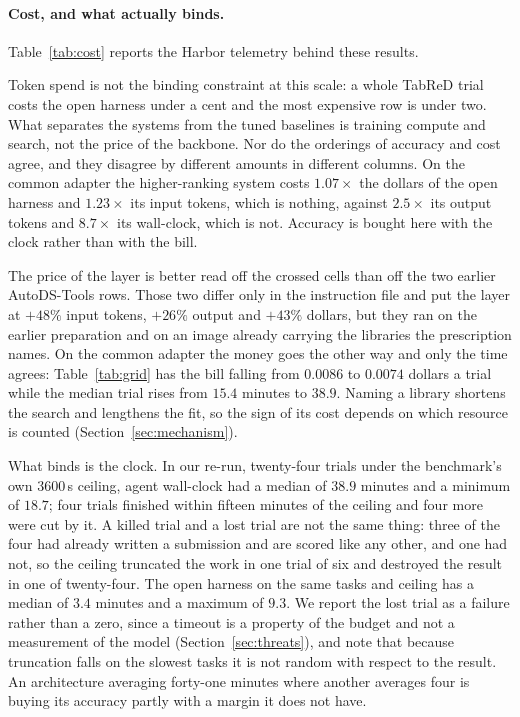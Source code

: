 

\paragraph{Cost, and what actually binds.}
Table~\ref{tab:cost} reports the Harbor telemetry behind these results.

Token spend is not the binding constraint at this scale: a whole TabReD trial
costs the open harness under a cent and the most expensive row is under two. What
separates the systems from the tuned baselines is training compute and search,
not the price of the backbone. Nor do the orderings of accuracy and cost agree,
and they disagree by different amounts in different columns. On the common
adapter the higher-ranking system costs $1.07\times$ the dollars of the open
harness and $1.23\times$ its input tokens, which is nothing, against
$2.5\times$ its output tokens and $8.7\times$ its wall-clock, which is not.
Accuracy is bought here with the clock rather than with the bill.

The price of the layer is better read off the crossed cells than off the two
earlier AutoDS-Tools rows. Those two differ only in the instruction file and put
the layer at $+48\%$ input tokens, $+26\%$ output and $+43\%$ dollars, but they
ran on the earlier preparation and on an image already carrying the libraries the
prescription names. On the common adapter the money goes the other way and only
the time agrees: Table~\ref{tab:grid} has the bill falling from $0.0086$ to
$0.0074$ dollars a trial while the median trial rises from $15.4$ minutes to
$38.9$. Naming a library shortens the search and lengthens the fit, so the sign
of its cost depends on which resource is counted
(Section~\ref{sec:mechanism}).

What binds is the clock. In our re-run, twenty-four trials under the benchmark's
own $3600$\,s ceiling, agent wall-clock had a median of $38.9$ minutes and a
minimum of $18.7$; four trials finished within fifteen minutes of the ceiling and
four more were cut by it. A killed trial and a lost trial are not the same thing:
three of the four had already written a submission and are scored like any other,
and one had not, so the ceiling truncated the work in one trial of six and
destroyed the result in one of twenty-four. The open harness on the same tasks
and ceiling has a median of $3.4$ minutes and a maximum of $9.3$. We report the
lost trial as a failure rather than a zero, since a timeout is a property of the
budget and not a measurement of the model (Section~\ref{sec:threats}), and note
that because truncation falls on the slowest tasks it is not random with respect
to the result. An architecture averaging forty-one minutes where another averages
four is buying its accuracy partly with a margin it does not have.

